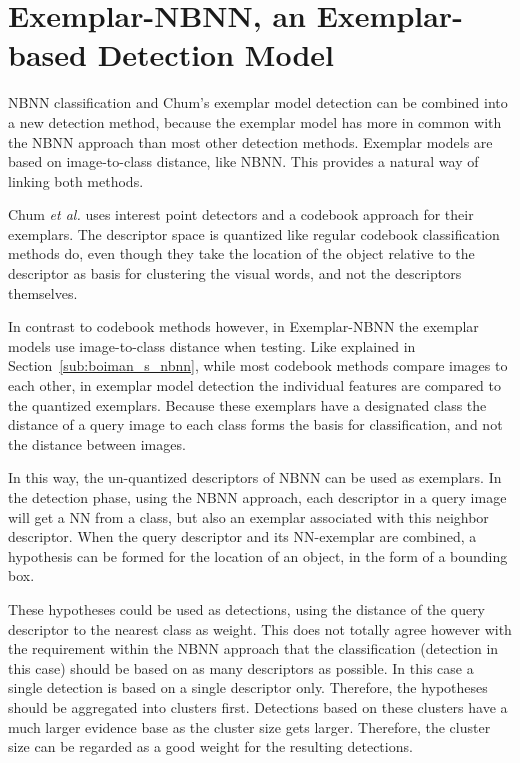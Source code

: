 
\section{Exemplar-NBNN, an Exemplar-based Detection Model} %
\label{cha:linking}

NBNN classification and Chum's exemplar model detection \cite{chum2007exemplar} can be combined into a new detection method, because the exemplar model has more in common with the NBNN approach than most other detection methods. Exemplar models are based on image-to-class distance, like NBNN. This provides a natural way of linking both methods.

Chum \emph{et al.}\cite{chum2007exemplar} uses interest point detectors and a codebook approach for their exemplars. The descriptor space is quantized like regular codebook classification methods do, even though they take the location of the object relative to the descriptor as basis for clustering the visual words, and not the descriptors themselves.

In contrast to codebook methods however, in Exemplar-NBNN the exemplar models use image-to-class distance when testing. Like explained in Section~\ref{sub:boiman_s_nbnn}, while most codebook methods compare images to each other, in exemplar model detection the individual features are compared to the quantized exemplars. Because these exemplars have a designated class the distance of a query image to each class forms the basis for classification, and not the distance between images.

In this way, the un-quantized descriptors of NBNN can be used as exemplars. In the detection phase, using the NBNN approach, each descriptor in a query image will get a NN from a class, but also an exemplar associated with this neighbor descriptor. When the query descriptor and its NN-exemplar are combined, a hypothesis can be formed for the location of an object, in the form of a bounding box.

These hypotheses could be used as detections, using the distance of the query descriptor to the nearest class as weight. This does not totally agree however with the requirement within the NBNN approach that the classification (detection in this case) should be based on as many descriptors as possible. In this case a single detection is based on a single descriptor only. Therefore, the hypotheses should be aggregated into clusters first. Detections based on these clusters have a much larger evidence base as the cluster size gets larger. Therefore, the cluster size can be regarded as a good weight for the resulting detections.


